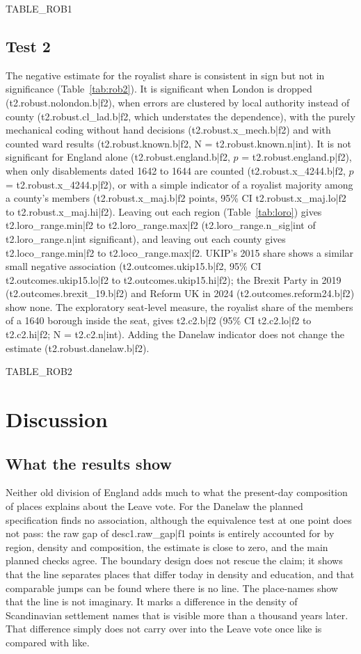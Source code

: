 \documentclass[11pt,a4paper]{article}
\begin{document}
{{TABLE_ROB1}}

\subsection{Test 2}
The negative estimate for the royalist share is consistent in sign but not in significance (Table~\ref{tab:rob2}). It is significant when London is dropped ({{t2.robust.nolondon.b|f2}}), when errors are clustered by local authority instead of county ({{t2.robust.cl_lad.b|f2}}, which understates the dependence), with the purely mechanical coding without hand decisions ({{t2.robust.x_mech.b|f2}}) and with counted ward results ({{t2.robust.known.b|f2}}, N = {{t2.robust.known.n|int}}). It is not significant for England alone ({{t2.robust.england.b|f2}}, $p$ = {{t2.robust.england.p|f2}}), when only disablements dated 1642 to 1644 are counted ({{t2.robust.x_4244.b|f2}}, $p$ = {{t2.robust.x_4244.p|f2}}), or with a simple indicator of a royalist majority among a county's members ({{t2.robust.x_maj.b|f2}} points, 95\% CI {{t2.robust.x_maj.lo|f2}} to {{t2.robust.x_maj.hi|f2}}). Leaving out each region (Table~\ref{tab:loro}) gives {{t2.loro_range.min|f2}} to {{t2.loro_range.max|f2}} ({{t2.loro_range.n_sig|int}} of {{t2.loro_range.n|int}} significant), and leaving out each county gives {{t2.loco_range.min|f2}} to {{t2.loco_range.max|f2}}. UKIP's 2015 share shows a similar small negative association ({{t2.outcomes.ukip15.b|f2}}, 95\% CI {{t2.outcomes.ukip15.lo|f2}} to {{t2.outcomes.ukip15.hi|f2}}); the Brexit Party in 2019 ({{t2.outcomes.brexit_19.b|f2}}) and Reform UK in 2024 ({{t2.outcomes.reform24.b|f2}}) show none. The exploratory seat-level measure, the royalist share of the members of a 1640 borough inside the seat, gives {{t2.c2.b|f2}} (95\% CI {{t2.c2.lo|f2}} to {{t2.c2.hi|f2}}; N = {{t2.c2.n|int}}). Adding the Danelaw indicator does not change the estimate ({{t2.robust.danelaw.b|f2}}).

{{TABLE_ROB2}}

\section{Discussion}\label{sec:disc}
\subsection{What the results show}
Neither old division of England adds much to what the present-day composition of places explains about the Leave vote. For the Danelaw the planned specification finds no association, although the equivalence test at one point does not pass: the raw gap of {{desc1.raw_gap|f1}} points is entirely accounted for by region, density and composition, the estimate is close to zero, and the main planned checks agree. The boundary design does not rescue the claim; it shows that the line separates places that differ today in density and education, and that comparable jumps can be found where there is no line. The place-names show that the line is not imaginary. It marks a difference in the density of Scandinavian settlement names that is visible more than a thousand years later. That difference simply does not carry over into the Leave vote once like is compared with like.
\end{document}
